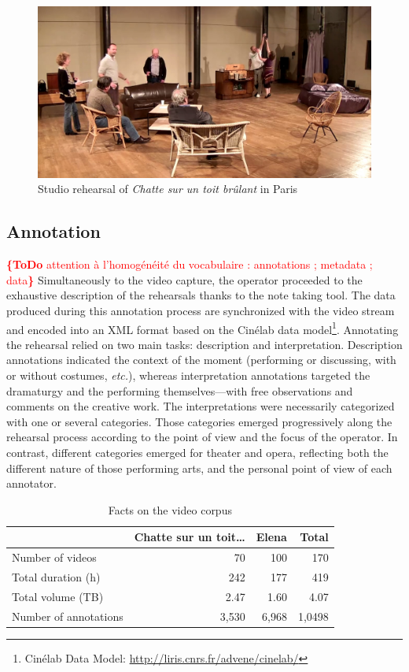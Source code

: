 \documentclass[conference]{IEEEtran}
\newcommand{\todo}[1]{\noindent\textcolor{red}{{\bf \{ToDo} #1{\bf \}}}}
\begin{document}
\begin{figure}[htb!]
  \centering
  \includegraphics[width=\columnwidth]{onstudio}
  \caption{Studio rehearsal of \emph{Chatte sur un toit brûlant} in Paris}
  \label{fig:onstudio}
\end{figure}

\subsection{Annotation}
\todo{attention à l'homogénéité du vocabulaire : annotations ; metadata ; data}
Simultaneously to the video capture, the operator proceeded to the exhaustive description of the rehearsals thanks to the note taking tool. The data produced during this annotation process are synchronized with the video stream and encoded into an XML format based on the Cinélab data model\footnote{Cinélab Data Model: \url{http://liris.cnrs.fr/advene/cinelab/}}.
Annotating the rehearsal relied on two main tasks: description and interpretation.  Description annotations indicated the context of the moment (performing or discussing, with or without costumes, \emph{etc.}), whereas interpretation annotations targeted the dramaturgy and the performing themselves---with free observations and comments on the creative work. The interpretations were necessarily categorized with one or several categories. Those categories emerged progressively along the rehearsal process according to the point of view and the focus of the operator. 
In contrast, different categories emerged for theater and opera, reflecting both the different nature of those performing arts, and the personal point of view of each annotator.

\begin{table}
\centering
{\small
\begin{tabular}{|l|r|r|r|}
\hline 
  & Chatte sur un toit\ldots & Elena & Total \\ 
\hline 
Number of videos & 70 & 100 & 170 \\ 
\hline 
Total duration (h) & 242 & 177 & 419 \\ 
\hline 
Total volume (TB) & 2.47 & 1.60 & 4.07 \\ 
\hline 
Number of annotations & 3,530 & 6,968 & 1,0498\\ 
\hline
\end{tabular} 
}
\caption{Facts on the video corpus}
\label{table_facts}
\end{table}
\end{document}
